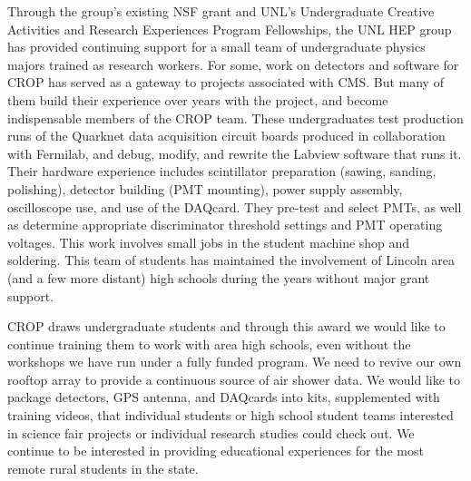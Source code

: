 Through the group’s existing NSF grant and UNL's Undergraduate Creative Activities and Research Experiences Program  Fellowships, the UNL HEP group has provided continuing support for a small team of undergraduate physics majors trained as research workers.  For some, work on detectors and software for CROP has served as a gateway to projects associated with CMS.  But many of them build their experience over years with the project, and become indispensable members of the CROP team.  These undergraduates test production runs of the Quarknet data acquisition circuit boards produced in collaboration with Fermilab, and debug, modify, and rewrite the Labview software that runs it.  Their hardware experience includes scintillator preparation (sawing, sanding, polishing), detector building (PMT mounting), power supply assembly, oscilloscope use, and use of the DAQcard. They pre-test and select PMTs, as well as determine appropriate discriminator threshold settings and PMT operating voltages.  This work involves small jobs in the student machine shop and soldering. This team of students has maintained the involvement of Lincoln area (and a few more distant) high schools during the years without major grant support.

CROP draws undergraduate students and through this award we would like to continue training them to work with area high schools, even without the workshops we have run under a fully funded program. We need to revive our own rooftop array to provide a continuous source of air shower data. We would like to package detectors, GPS antenna, and DAQcards into kits, supplemented with training videos, that individual students or high school student teams interested in science fair projects or individual research studies could check out.  We continue to be interested in providing educational experiences for the most remote rural students in the state. 

